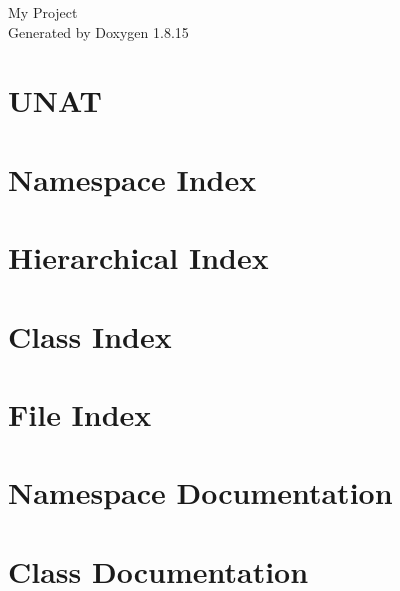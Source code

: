 \let\mypdfximage\pdfximage\def\pdfximage{\immediate\mypdfximage}\documentclass[twoside]{book}
\newcommand{\+}{\discretionary{\mbox{\scriptsize$\hookleftarrow$}}{}{}}
\newcommand{\clearemptydoublepage}{%
  \newpage{\pagestyle{empty}\cleardoublepage}%
}
\begin{document}
\hypersetup{pageanchor=false,
             bookmarksnumbered=true,
             pdfencoding=unicode
            }
\begin{titlepage}
\vspace*{7cm}
\begin{center}%
{\Large My Project }\\
\vspace*{1cm}
{\large Generated by Doxygen 1.8.15}\\
\end{center}
\end{titlepage}
\clearemptydoublepage
{}
\tableofcontents
\clearemptydoublepage
{}
\hypersetup{pageanchor=true}

\chapter{U\+N\+AT}
\label{md_C_1_Users_lenovo_Documents_Work_UNAT_README}

\chapter{Namespace Index}

\chapter{Hierarchical Index}

\chapter{Class Index}

\chapter{File Index}

\chapter{Namespace Documentation}

\chapter{Class Documentation}










\end{document}
